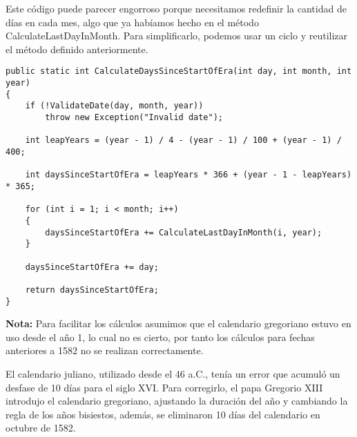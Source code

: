 Este código puede parecer engorroso porque necesitamos redefinir la cantidad de días en cada mes, algo que ya habíamos hecho en el método CalculateLastDayInMonth. Para simplificarlo, podemos usar un ciclo y reutilizar el método definido anteriormente.

\begin{lstlisting}
public static int CalculateDaysSinceStartOfEra(int day, int month, int year)
{
    if (!ValidateDate(day, month, year))
        throw new Exception("Invalid date");
        
    int leapYears = (year - 1) / 4 - (year - 1) / 100 + (year - 1) / 400;
    
    int daysSinceStartOfEra = leapYears * 366 + (year - 1 - leapYears) * 365;
    
    for (int i = 1; i < month; i++)
    {
        daysSinceStartOfEra += CalculateLastDayInMonth(i, year);
    }
    
    daysSinceStartOfEra += day;
    
    return daysSinceStartOfEra;
}
\end{lstlisting}

\textbf{Nota:} Para facilitar los cálculos asumimos que el calendario gregoriano estuvo en uso desde el año 1, lo cual no es cierto, por tanto los cálculos para fechas anteriores a 1582 no se realizan correctamente.

\begin{tcolorbox}
    El calendario juliano, utilizado desde el 46 a.C., tenía un error que acumuló un desfase de 10 días para el siglo XVI. Para corregirlo, el papa Gregorio XIII introdujo el calendario gregoriano, ajustando la duración del año y cambiando la regla de los años bisiestos, además, se eliminaron 10 días del calendario en octubre de 1582.
\end{tcolorbox}